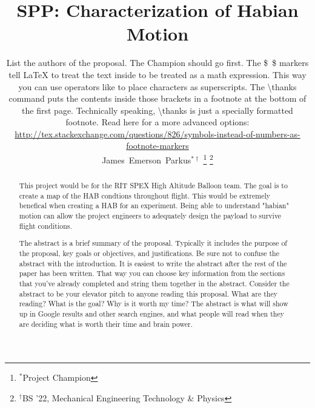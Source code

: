 \documentclass[journal]{SPEXformat}
\title{SPP: Characterization of Habian Motion}
\author{
  \begin{help}
    List the authors of the proposal. The Champion should go first.
    The \$~\$ markers tell \LaTeX{} to treat the text inside to be treated as a math expression. This way you can use operators like \textcaret{} to place characters as superscripts.
    The \textbackslash{}thanks command puts the contents inside those brackets in a footnote at the bottom of the first page. Technically speaking, \textbackslash{}thanks is just a specially formatted footnote.
    Read here for a more advanced options:  \url{http://tex.stackexchange.com/questions/826/symbols-instead-of-numbers-as-footnote-markers}
  \end{help}
  James~Emerson~Parkus$^{*\dagger}$%
    \thanks{$^{*}$Project Champion}%
    \thanks{$^{\dagger}$BS '22, Mechanical Engineering Technology \& Physics}

}
\newenvironment{help}{
  \ttfamily\footnotesize\sloppy
  \begin{lrbox}{\helpbox}\begin{minipage}{\linewidth}
  }{
  \end{minipage}\end{lrbox}
  \ifbool{showhelp}{
    \fbox{\usebox{\helpbox}}
  }{}
}
\begin{document}
\maketitle%

\begin{abstract}
  This project would be for the RIT SPEX High Altitude Balloon team. The goal is to create a map of the HAB condtions throughout
  flight. This would be extremely benefical when creating a HAB for an experiment. Being able to understand "habian" motion
  can allow the project engineers to adequately design the payload to survive flight conditions.

  \begin{help}
      The abstract is a brief summary of the proposal. Typically it includes the purpose of the proposal, key goals or objectives, and justifications.
      Be sure not to confuse the abstract with the introduction.
      It is easiest to write the abstract after the rest of the paper has been written.
      That way you can choose key information from the sections that you've already completed and string them together in the abstract.
      Consider the abstract to be your elevator pitch to anyone reading this proposal.
      What are they reading?
      What is the goal?
      Why is it worth my time?
      The abstract is what will show up in Google results and other search engines, and what people will read when they are deciding what is worth their time and brain power.
    \end{help}
\end{abstract}

\label{sec:nomenclature}
\newcommand{\nomunit}[1]{%
\renewcommand{\nomentryend}{\hspace*{\fill}#1}}
\renewcommand{\nompreamble}{
  \begin{help}
    If you include mathematical expressions or express variables in the proposal, list them with their corresponding definitions here as a list.
    The two lines below make it look nice when defining units/values to constants.

    Note that math terms and non-math terms are separated and alphabetized, regardless of the order in which they are defined. (Recall terms \$like this\$ are in the math environment)
    Read more about advanced nomenclature formatting here:\\
    \url{https://www.sharelatex.com/learn/Nomenclatures}
  \end{help}
  }
\end{document}

